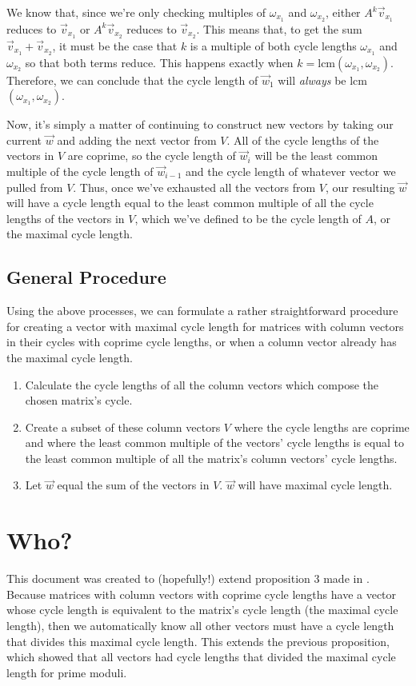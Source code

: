 \documentclass[a4paper, 12pt, reqno]{amsart}
\newcommand{\ssection}[1]{\vspace{1cm}\section{#1}}
\newcommand{\ssubsection}[1]{\vspace{0.25cm}\subsection{#1}}
\begin{document}
	We know that, since we're only checking multiples of $\omega_{x_{1}}$ and $\omega_{x_{2}}$,
	either $A^{k}\vec{v}_{x_{1}}$ reduces to $\vec{v}_{x_{1}}$ or $A^k\vec{v}_{x_{2}}$ reduces to
	$\vec{v}_{x_{2}}$. This means that, to get the sum $\vec{v}_{x_{1}} + \vec{v}_{x_{2}}$, it
	must be the case that $k$ is a multiple of both cycle lengths $\omega_{x_{1}}$ and $\omega_{x_{2}}$
	so that both terms reduce. This happens exactly when $k = \text{lcm}(\omega_{x_{1}},
	\omega_{x_{2}})$. Therefore, we can conclude that the cycle length of $\vec{w}_{1}$ will \emph{always}
	be lcm$(\omega_{x_{1}}, \omega_{x_{2}})$.
	
	Now, it's simply a matter of continuing to construct new vectors by taking our current $\vec{w}$ and
	adding the next vector from $V$. All of the cycle lengths of the vectors in $V$ are coprime, so
	the cycle length of $\vec{w}_{i}$ will be the least common multiple of the cycle length of $\vec{w}_{i-1}$
	and the cycle length of whatever vector we pulled from $V$. Thus, once we've exhausted all the vectors
	from $V$, our resulting $\vec{w}$ will have a cycle length equal to the least common multiple of all
	the cycle lengths of the vectors in $V$, which we've defined to be the cycle length of $A$, or the maximal
	cycle length. 
	
	\ssubsection{General Procedure}
	Using the above processes, we can formulate a rather straightforward procedure for creating a vector 
	with maximal cycle length for matrices with column vectors in their cycles with coprime cycle lengths,
	or when a column vector already has the maximal cycle length.
	
	\begin{enumerate}
		\item Calculate the cycle lengths of all the column vectors which compose the chosen matrix's cycle.
		\item Create a subset of these column vectors $V$ where the cycle lengths are coprime and where
		the least common multiple of the vectors' cycle lengths is equal to the least common multiple of all 
		the matrix's column vectors' cycle lengths.
		\item Let $\vec{w}$ equal the sum of the vectors in $V$. $\vec{w}$ will have maximal cycle length.
	\end{enumerate}
	
	\ssection{Who?}
	This document was created to (hopefully!) extend proposition 3 made in \citet{Mendivil2012}.
	Because matrices with column vectors with coprime cycle lengths have a vector whose cycle length is 
	equivalent to the matrix's cycle length (the maximal cycle length), then we automatically know all 
	other vectors must have a cycle length that divides this maximal cycle length. This extends the previous 
	proposition, which showed that all vectors had cycle lengths that divided the maximal cycle length for prime 
	moduli.
	
	
	
\end{document}
